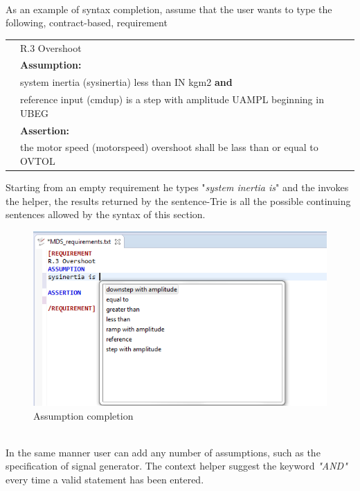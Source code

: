 \paragraph{} As an example of syntax completion, assume that the user wants to type the following, contract-based, requirement
\begin{center}
\begin{tabular}{ll}
&R.3 Overshoot \\
&\textbf{Assumption:}\\
&system inertia (sysinertia) less than IN kgm2 \textbf{and} \\
&reference input (cmdup) is a step with amplitude UAMPL beginning in UBEG \\
&\textbf{Assertion:}\\
&the motor speed (motorspeed) overshoot shall be lass than or equal to OVTOL\\
\end{tabular}
\end{center}
Starting from an empty requirement he types "\textit{system inertia is}" and the invokes the helper, the results returned by the sentence-Trie is all the possible continuing sentences allowed by the syntax of this section.
\begin{figure}[!h]
\centering
\includegraphics[width=.6\textwidth]{Figs/assumcompl.png}
\caption{Assumption completion}
\label{fig:assumcompl}
\end{figure}
\noindent
\\
In the same manner user can add any number of assumptions, such as the specification of signal generator. The context helper suggest the keyword \textit{"AND"} every time a valid statement has been entered. 

